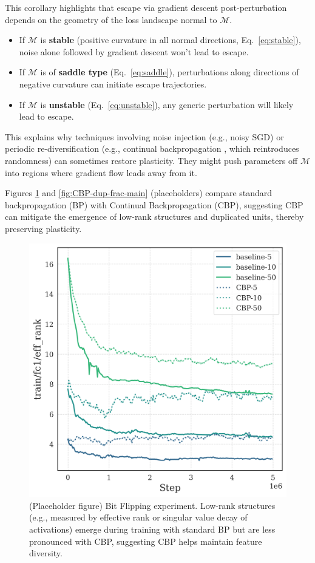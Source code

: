 \documentclass{article}
\begin{document}
This corollary highlights that escape via gradient descent post-perturbation depends on the geometry of the loss landscape normal to $\mathcal{M}$.
\begin{itemize}
    \item If $\mathcal{M}$ is \textbf{stable} (positive curvature in all normal directions, Eq.~\ref{eq:stable}), noise alone followed by gradient descent won't lead to escape.
    \item If $\mathcal{M}$ is of \textbf{saddle type} (Eq.~\ref{eq:saddle}), perturbations along directions of negative curvature can initiate escape trajectories.
    \item If $\mathcal{M}$ is \textbf{unstable} (Eq.~\ref{eq:unstable}), any generic perturbation will likely lead to escape.
\end{itemize}
This explains why techniques involving noise injection (e.g., noisy SGD) or periodic re-diversification (e.g., continual backpropagation \citep{dohare2024loss}, which reintroduces randomness) can sometimes restore plasticity. They might push parameters off $\mathcal{M}$ into regions where gradient flow leads away from it.

Figures \ref{fig:CBP-scale-rank-main} and \ref{fig:CBP-dup-frac-main} (placeholders) compare standard backpropagation (BP) with Continual Backpropagation (CBP), suggesting CBP can mitigate the emergence of low-rank structures and duplicated units, thereby preserving plasticity.

\begin{figure}[h!]
    \centering
    \includegraphics[width=0.33\linewidth]{CBP-scale-rank.png}
    \caption{(Placeholder figure) Bit Flipping experiment. Low-rank structures (e.g., measured by effective rank or singular value decay of activations) emerge during training with standard BP but are less pronounced with CBP, suggesting CBP helps maintain feature diversity.}
    \label{fig:CBP-scale-rank-main}
\end{figure}
\end{document}
